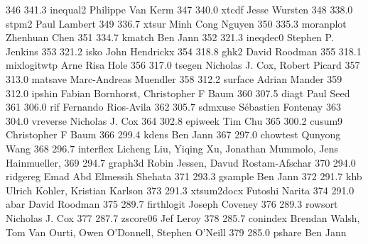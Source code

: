    346    341.3    inequal2      Philippe Van Kerm                       
   347    340.0    xtcdf         Jesse Wursten                           
   348    338.0    stpm2         Paul Lambert                            
   349    336.7    xtsur         Minh Cong Nguyen                        
   350    335.3    moranplot     Zhenhuan Chen                           
   351    334.7    kmatch        Ben Jann                                
   352    321.3    ineqdec0      Stephen P. Jenkins                      
   353    321.2    isko          John Hendrickx                          
   354    318.8    ghk2          David Roodman                           
   355    318.1    mixlogitwtp   Arne Risa Hole                          
   356    317.0    tsegen        Nicholas J. Cox, Robert Picard          
   357    313.0    matsave       Marc-Andreas Muendler                   
   358    312.2    surface       Adrian Mander                           
   359    312.0    ipshin        Fabian Bornhorst, Christopher F Baum    
   360    307.5    diagt         Paul Seed                               
   361    306.0    rif           Fernando Rios-Avila                     
   362    305.7    sdmxuse       Sébastien Fontenay                     
   363    304.0    vreverse      Nicholas J. Cox                         
   364    302.8    epiweek       Tim Chu                                 
   365    300.2    cusum9        Christopher F Baum                      
   366    299.4    kdens         Ben Jann                                
   367    297.0    chowtest      Qunyong Wang                            
   368    296.7    interflex     Licheng Liu, Yiqing Xu, Jonathan        
                                   Mummolo, Jens Hainmueller,              
   369    294.7    graph3d       Robin Jessen, Davud Rostam-Afschar      
   370    294.0    ridgereg      Emad Abd Elmessih Shehata               
   371    293.3    gsample       Ben Jann                                
   372    291.7    khb           Ulrich Kohler, Kristian Karlson         
   373    291.3    xtsum2docx    Futoshi Narita                          
   374    291.0    abar          David Roodman                           
   375    289.7    firthlogit    Joseph Coveney                          
   376    289.3    rowsort       Nicholas J. Cox                         
   377    287.7    zscore06      Jef Leroy                               
   378    285.7    conindex      Brendan Walsh, Tom Van Ourti, Owen      
                                   O'Donnell, Stephen O'Neill              
   379    285.0    pshare        Ben Jann                                
